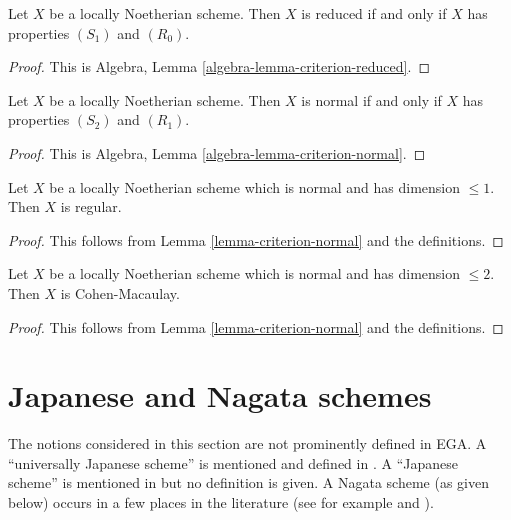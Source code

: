 \begin{lemma}
\label{lemma-criterion-reduced}
Let $X$ be a locally Noetherian scheme.
Then $X$ is reduced if and only if $X$ has properties $(S_1)$ and $(R_0)$.
\end{lemma}

\begin{proof}
This is Algebra, Lemma \ref{algebra-lemma-criterion-reduced}.
\end{proof}

\begin{lemma}
\label{lemma-criterion-normal}
Let $X$ be a locally Noetherian scheme.
Then $X$ is normal if and only if $X$ has properties $(S_2)$ and $(R_1)$.
\end{lemma}

\begin{proof}
This is Algebra, Lemma \ref{algebra-lemma-criterion-normal}.
\end{proof}

\begin{lemma}
\label{lemma-normal-dimension-1-regular}
Let $X$ be a locally Noetherian scheme which is normal and
has dimension $\leq 1$. Then $X$ is regular.
\end{lemma}

\begin{proof}
This follows from Lemma \ref{lemma-criterion-normal} and the definitions.
\end{proof}

\begin{lemma}
\label{lemma-normal-dimension-2-Cohen-Macaulay}
Let $X$ be a locally Noetherian scheme which is normal and
has dimension $\leq 2$. Then $X$ is Cohen-Macaulay.
\end{lemma}

\begin{proof}
This follows from Lemma \ref{lemma-criterion-normal} and the definitions.
\end{proof}







\section{Japanese and Nagata schemes}
\label{section-nagata}

\noindent
The notions considered in this section are not prominently defined in EGA.
A ``universally Japanese scheme'' is mentioned and defined in
\cite[IV Corollary 5.11.4]{EGA}. A ``Japanese scheme'' is mentioned in
\cite[IV Remark 10.4.14 (ii)]{EGA} but no definition is given.
A Nagata scheme (as given below) occurs in a few
places in the literature (see for example \cite[Definition 8.2.30]{Liu} and
\cite[Page 142]{Greco}).

